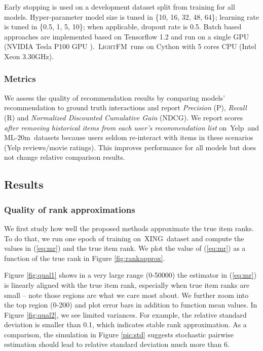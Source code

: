 \documentclass[letterpaper]{article}
\newcommand{\lightfm}{\textsc{LightFM}}
\newcommand{\xing}{\textsf{XING}}
\newcommand{\yelp}{\textsf{Yelp}}
\newcommand{\movietwenty}{\textsf{ML-20m}}
\begin{document}
Early stopping is used on a development dataset split from training for all models. Hyper-parameter model size is tuned in \{10, 16, 32, 48, 64\}; learning rate is tuned in \{0.5, 1, 5, 10\}; when applicable, dropout rate is 0.5. Batch based approaches are implemented based on Tensorflow 1.2 and run on a single GPU (NVIDIA Tesla P100 GPU ).~\lightfm~runs on Cython with 5 cores CPU (Intel Xeon 3.30GHz).

\subsubsection{Metrics}
We assess the quality of recommendation results by comparing models' recommendation to ground truth interactions and report \textit{Precision} (P), \textit{Recall} (R) and \textit{Normalized Discounted Cumulative Gain} (NDCG). We report scores \textit{after removing historical items from each user's recommendation list} on~\yelp~and \movietwenty~datasets because users seldom re-interact with items in these scenarios (Yelp reviews/movie ratings). This improves performance for all models but does not change relative comparison results.

\subsection{Results}

\subsubsection{Quality of rank approximations}
We first study how well the proposed methods approximate the true item ranks. To do that, we run one epoch of training on~\xing~dataset and compute the values in (\ref{eq:mr}) and the true item rank. We plot the value of (\ref{eq:mr}) as a function of the true rank in Figure \ref{fig:rankapprox}.

Figure \ref{fig:qual1} shows in a very large range (0-50000) the estimator in (\ref{eq:mr}) is linearly aligned with the true item rank, especially when true item ranks are small -- note those regions are what we care most about. We further zoom into the top region (0-200) and plot error bars in addition to function mean values. In Figure \ref{fig:qual2}, we see limited variances. For example, the relative standard deviation is smaller than 0.1, which indicates stable rank approximation. As a comparison, the simulation in Figure \ref{pic:std} suggests stochastic pairwise estimation should lead to relative standard deviation much more than 6.
\end{document}
